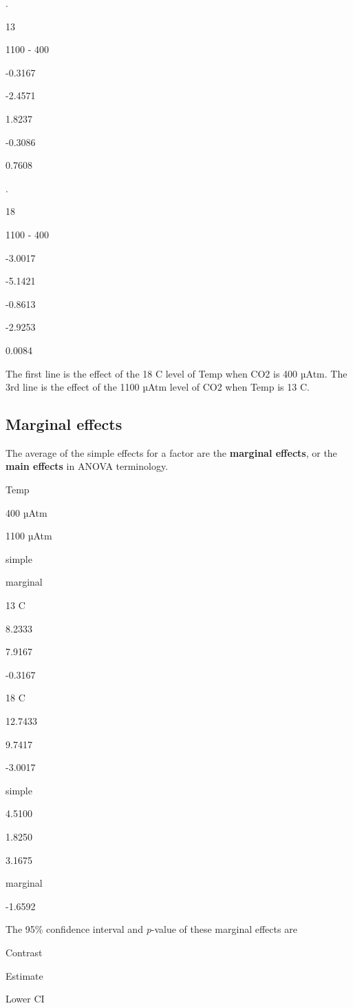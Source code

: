 \documentclass[]{book}
\begin{document}
.

13

1100 - 400

-0.3167

-2.4571

1.8237

-0.3086

0.7608

.

18

1100 - 400

-3.0017

-5.1421

-0.8613

-2.9253

0.0084

The first line is the effect of the 18 C level of Temp when CO2 is 400 µAtm. The 3rd line is the effect of the 1100 µAtm level of CO2 when Temp is 13 C.

\hypertarget{marginal-effects}{%
\subsection{Marginal effects}\label{marginal-effects}}

The average of the simple effects for a factor are the \textbf{marginal effects}, or the \textbf{main effects} in ANOVA terminology.

Temp

400 µAtm

1100 µAtm

simple

marginal

13 C

8.2333

7.9167

-0.3167

18 C

12.7433

9.7417

-3.0017

simple

4.5100

1.8250

3.1675

marginal

-1.6592

The 95\% confidence interval and \emph{p}-value of these marginal effects are

Contrast

Estimate

Lower CI
\end{document}
